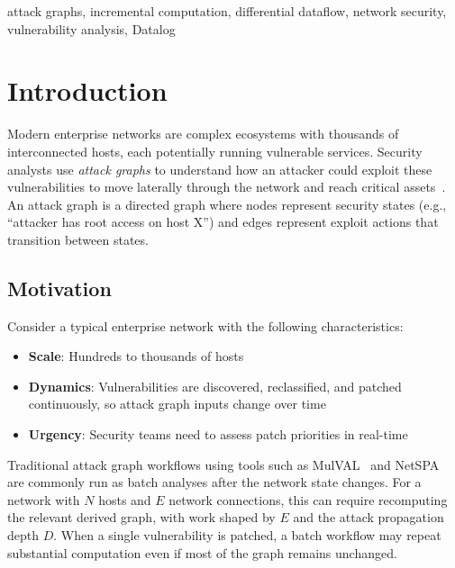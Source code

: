 \documentclass[conference]{IEEEtran}
\begin{document}
\begin{IEEEkeywords}
attack graphs, incremental computation, differential dataflow, network security, vulnerability analysis, Datalog
\end{IEEEkeywords}

\section{Introduction}

Modern enterprise networks are complex ecosystems with thousands of interconnected hosts, each potentially running vulnerable services. Security analysts use \textit{attack graphs} to understand how an attacker could exploit these vulnerabilities to move laterally through the network and reach critical assets~\cite{sheyner2002automated}. An attack graph is a directed graph where nodes represent security states (e.g., ``attacker has root access on host X'') and edges represent exploit actions that transition between states.

\subsection{Motivation}

Consider a typical enterprise network with the following characteristics:
\begin{itemize}
    \item \textbf{Scale}: Hundreds to thousands of hosts
    \item \textbf{Dynamics}: Vulnerabilities are discovered, reclassified, and patched continuously, so attack graph inputs change over time
    \item \textbf{Urgency}: Security teams need to assess patch priorities in real-time
\end{itemize}

Traditional attack graph workflows using tools such as MulVAL~\cite{ou2006mulval} and NetSPA~\cite{ingols2006practical} are commonly run as batch analyses after the network state changes. For a network with $N$ hosts and $E$ network connections, this can require recomputing the relevant derived graph, with work shaped by $E$ and the attack propagation depth $D$. When a single vulnerability is patched, a batch workflow may repeat substantial computation even if most of the graph remains unchanged.
\end{document}
